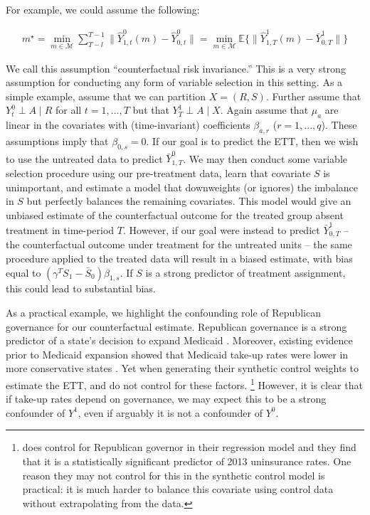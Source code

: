 For example, we could assume the following:

\begin{align}\label{assumption:second}
m^\star = \min_{m \in \mathcal{M}}\sum_{T - l}^{T-1}\|\hat{Y}^0_{1, t}(m) - \hat{Y}^0_{0, t}\| = \min_{m \in \mathcal{M}}\mathbb{E}\{\|\hat{Y}^1_{1, T}(m) - \bar{Y}^1_{0, T}\|\}
\end{align}

We call this assumption ``counterfactual risk invariance.'' This is a very strong assumption for conducting any form of variable selection in this setting. As a simple example, assume that we can partition $X = (R, S)$. Further assume that $Y^0_t \perp A \mid R$ for all $t = 1, ..., T$ but that $Y^1_T \perp A \mid X$. Again assume that $\mu_a$ are linear in the covariates with (time-invariant) coefficients $\beta_{a, r}$ ($r = 1, ..., q$). These assumptions imply that $\beta_{0, s} = 0$. If our goal is to predict the ETT, then we wish to use the untreated data to predict $\bar{Y}_{1, T}^0$. We may then conduct some variable selection procedure using our pre-treatment data, learn that covariate $S$ is unimportant, and estimate a model that downweights (or ignores) the imbalance in $S$ but perfectly balances the remaining covariates. This model would give an unbiased estimate of the counterfactual outcome for the treated group absent treatment in time-period $T$. However, if our goal were instead to predict $\bar{Y}^1_{0, T}$ -- the counterfactual outcome under treatment for the untreated units -- the same procedure applied to the treated data will result in a biased estimate, with bias equal to $(\gamma^TS_1 - \bar{S}_0) \beta_{1, s}$. If $S$ is a strong predictor of treatment assignment, this could lead to substantial bias.

As a practical example, we highlight the confounding role of Republican governance for our counterfactual estimate. Republican governance is a strong predictor of a state's decision to expand Medicaid \cite{courtemanche2017early}. Moreover, existing evidence prior to Medicaid expansion showed that Medicaid take-up rates were lower in more conservative states \cite{sommers2012understanding}. Yet when generating their synthetic control weights to estimate the ETT, \cite{courtemanche2017early} and \cite{kaestner2017effects} do not control for these factors. \footnote{\cite{courtemanche2017early} does control for Republican governor in their regression model and they find that it is a statistically significant predictor of 2013 uninsurance rates. One reason they may not control for this in the synthetic control model is practical: it is much harder to balance this covariate using control data without extrapolating from the data.} However, it is clear that if take-up rates depend on governance, we may expect this to be a strong confounder of $Y^1$, even if arguably it is not a confounder of $Y^0$.

